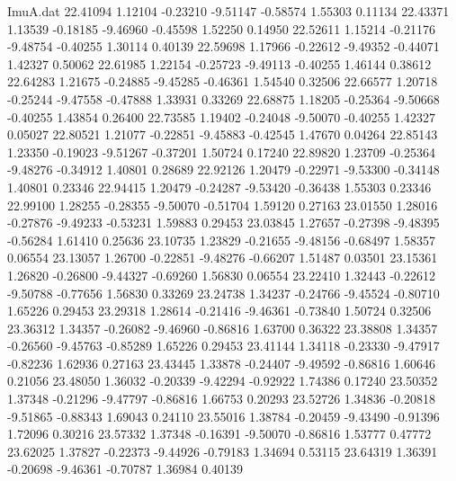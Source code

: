 \begin{filecontents}{ImuA.dat}
  22.41094    1.12104   -0.23210   -9.51147   -0.58574    1.55303    0.11134
  22.43371    1.13539   -0.18185   -9.46960   -0.45598    1.52250    0.14950
  22.52611    1.15214   -0.21176   -9.48754   -0.40255    1.30114    0.40139
  22.59698    1.17966   -0.22612   -9.49352   -0.44071    1.42327    0.50062
  22.61985    1.22154   -0.25723   -9.49113   -0.40255    1.46144    0.38612
  22.64283    1.21675   -0.24885   -9.45285   -0.46361    1.54540    0.32506
  22.66577    1.20718   -0.25244   -9.47558   -0.47888    1.33931    0.33269
  22.68875    1.18205   -0.25364   -9.50668   -0.40255    1.43854    0.26400
  22.73585    1.19402   -0.24048   -9.50070   -0.40255    1.42327    0.05027
  22.80521    1.21077   -0.22851   -9.45883   -0.42545    1.47670    0.04264
  22.85143    1.23350   -0.19023   -9.51267   -0.37201    1.50724    0.17240
  22.89820    1.23709   -0.25364   -9.48276   -0.34912    1.40801    0.28689
  22.92126    1.20479   -0.22971   -9.53300   -0.34148    1.40801    0.23346
  22.94415    1.20479   -0.24287   -9.53420   -0.36438    1.55303    0.23346
  22.99100    1.28255   -0.28355   -9.50070   -0.51704    1.59120    0.27163
  23.01550    1.28016   -0.27876   -9.49233   -0.53231    1.59883    0.29453
  23.03845    1.27657   -0.27398   -9.48395   -0.56284    1.61410    0.25636
  23.10735    1.23829   -0.21655   -9.48156   -0.68497    1.58357    0.06554
  23.13057    1.26700   -0.22851   -9.48276   -0.66207    1.51487    0.03501
  23.15361    1.26820   -0.26800   -9.44327   -0.69260    1.56830    0.06554
  23.22410    1.32443   -0.22612   -9.50788   -0.77656    1.56830    0.33269
  23.24738    1.34237   -0.24766   -9.45524   -0.80710    1.65226    0.29453
  23.29318    1.28614   -0.21416   -9.46361   -0.73840    1.50724    0.32506
  23.36312    1.34357   -0.26082   -9.46960   -0.86816    1.63700    0.36322
  23.38808    1.34357   -0.26560   -9.45763   -0.85289    1.65226    0.29453
  23.41144    1.34118   -0.23330   -9.47917   -0.82236    1.62936    0.27163
  23.43445    1.33878   -0.24407   -9.49592   -0.86816    1.60646    0.21056
  23.48050    1.36032   -0.20339   -9.42294   -0.92922    1.74386    0.17240
  23.50352    1.37348   -0.21296   -9.47797   -0.86816    1.66753    0.20293
  23.52726    1.34836   -0.20818   -9.51865   -0.88343    1.69043    0.24110
  23.55016    1.38784   -0.20459   -9.43490   -0.91396    1.72096    0.30216
  23.57332    1.37348   -0.16391   -9.50070   -0.86816    1.53777    0.47772
  23.62025    1.37827   -0.22373   -9.44926   -0.79183    1.34694    0.53115
  23.64319    1.36391   -0.20698   -9.46361   -0.70787    1.36984    0.40139

\end{filecontents}
